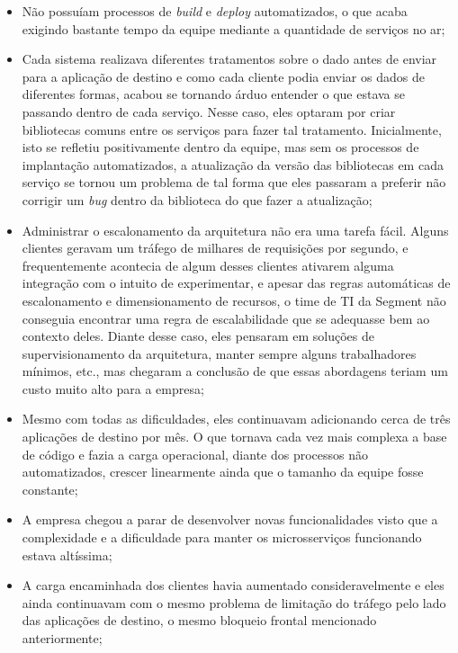\begin{itemize}
    \item Não possuíam processos de \textit{build} e \textit{deploy} automatizados, o que acaba
        exigindo bastante tempo da equipe mediante a quantidade de serviços no ar;
    \item Cada sistema realizava diferentes tratamentos sobre o dado antes de enviar para a
        aplicação de destino e como cada cliente podia enviar os dados de diferentes formas, acabou
        se tornando árduo entender o que estava se passando dentro de cada serviço. Nesse caso, eles
        optaram por criar bibliotecas comuns entre os serviços para fazer tal tratamento.
        Inicialmente, isto se refletiu positivamente dentro da equipe, mas sem os processos de
        implantação automatizados, a atualização da versão das bibliotecas em cada serviço se tornou
        um problema de tal forma que eles passaram a preferir não corrigir um \textit{bug} dentro da
        biblioteca do que fazer a atualização;
    \item Administrar o escalonamento da arquitetura não era uma tarefa fácil. Alguns clientes
        geravam um tráfego de milhares de requisições por segundo, e frequentemente acontecia de
        algum desses clientes ativarem alguma integração com o intuito de experimentar, e apesar das regras
        automáticas de escalonamento e dimensionamento de recursos, o time de \gls{TI} da Segment
        não conseguia encontrar uma regra de escalabilidade que se adequasse bem ao contexto deles.
        Diante desse caso, eles pensaram em soluções de supervisionamento da arquitetura, manter
        sempre alguns trabalhadores mínimos, etc., mas chegaram a conclusão de que essas abordagens
        teriam um custo muito alto para a empresa;
    \item Mesmo com todas as dificuldades, eles continuavam adicionando cerca de três aplicações de
        destino por mês. O que tornava cada vez mais complexa a base de código e fazia a carga
        operacional, diante dos processos não automatizados, crescer linearmente ainda que o tamanho
        da equipe fosse constante;
    \item A empresa chegou a parar de desenvolver novas funcionalidades visto que a complexidade e a
        dificuldade para manter os microsserviços funcionando estava altíssima;
    \item A carga encaminhada dos clientes havia aumentado consideravelmente e eles ainda
        continuavam com o mesmo problema de limitação do tráfego pelo lado das aplicações de
        destino, o mesmo bloqueio frontal mencionado anteriormente;
\end{itemize}

